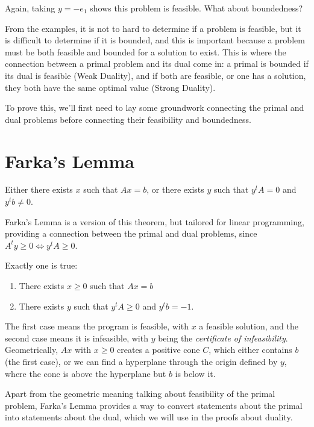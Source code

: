 \documentclass{article}
\begin{document}
\begin{example}
	Again, taking $y = -e_1$ shows this problem is feasible. What about boundedness?
\end{example}

From the examples, it is not to hard to determine if a problem is feasible, but it is difficult to
determine if it is bounded, and this is important because a problem must be both feasible and
bounded for a solution to exist. This is where the connection between a primal problem and its dual
come in: a primal is bounded if its dual is feasible (Weak Duality), and if both are feasible, or
one has a solution, they both have the same optimal value (Strong Duality).

To prove this, we'll first need to lay some groundwork connecting the primal and dual problems
before connecting their feasibility and boundedness.

\section{Farka's Lemma}

\begin{theorem}
	\label{thm:funlinalg}%
	Either there exists $x$ such that $Ax = b$, or there exists $y$ such that $y^t A = 0$ and
	$y^t b \neq 0$.
\end{theorem}

Farka's Lemma is a version of this theorem, but tailored for linear programming, providing a
connection between the primal and dual problems, since $A^t y \ge 0 \iff y^t A \ge 0$.

\begin{farkas}
	Exactly one is true:
	\begin{enumerate}
		\item There exists $x \ge 0$ such that $Ax = b$
		\item There exists $y$ such that $y^t A \ge 0$ and $y^t b = -1$.
	\end{enumerate}
\end{farkas}

The first case means the program is feasible, with $x$ a feasible solution, and the second case
means it is infeasible, with $y$ being the \emph{certificate of infeasibility}. Geometrically, $Ax$
with $x \ge 0$ creates a positive cone $C$, which either contains $b$ (the first case), or we can
find a hyperplane through the origin defined by $y$, where the cone is above the hyperplane but $b$
is below it.

Apart from the geometric meaning talking about feasibility of the primal problem, Farka's Lemma
provides a way to convert statements about the primal into statements about the dual, which we will
use in the proofs about duality.
\end{document}
